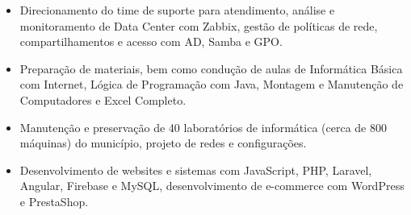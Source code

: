 \documentclass[10pt,a4paper,ragged2e]{altacv}
\begin{document}
\vspace{10px}

\begin{itemize}
  \item Direcionamento do time de suporte para atendimento, análise e monitoramento de Data Center com Zabbix, gestão de políticas de rede, compartilhamentos e acesso com AD, Samba e GPO.
\end{itemize}

\vspace{10px}

\begin{itemize}
  \item Preparação de materiais, bem como condução de aulas de Informática Básica com Internet, Lógica de Programação com Java, Montagem e Manutenção de Computadores e Excel Completo.
\end{itemize}

\vspace{10px}

\begin{itemize}
  \item Manutenção e preservação de 40 laboratórios de informática (cerca de 800 máquinas) do município, projeto de redes e configurações.
\end{itemize}

\vspace{10px}

\begin{itemize}
  \item Desenvolvimento de websites e sistemas com JavaScript, PHP, Laravel, Angular, Firebase e MySQL, desenvolvimento de e-commerce com WordPress e PrestaShop.
\end{itemize}

\vspace{10px}



\clearpage
\end{document}
